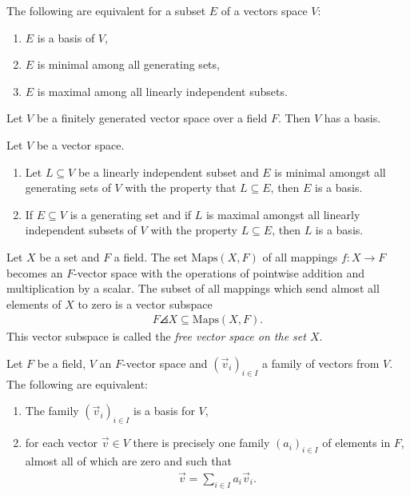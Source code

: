 \documentclass{article}
\begin{document}
\begin{theorem}[Theorem 1.5.12]
	The following are equivalent for a subset $E$ of a vectors space $V$:
	\begin{enumerate}
		\item $E$ is a basis of $V$,
		\item $E$ is minimal among all generating sets,
		\item $E$ is maximal among all linearly independent subsets.
	\end{enumerate}
\end{theorem}

\begin{corollary}[Corollary 1.5.13]
	Let $V$ be a finitely generated vector space over a field $F$. Then $V$
	has a basis.
\end{corollary}

\begin{theorem}[Theorem 1.5.14]
	Let $V$ be a vector space.
	\begin{enumerate}
		\item Let $L\subseteq V$ be a linearly independent subset and $E$ is minimal
		      amongst all generating sets of $V$ with the property that $L\subseteq E$,
		      then $E$ is a basis.
		\item If $E\subseteq V$ is a generating set and if $L$ is maximal amongst all
		      linearly independent subsets of $V$ with the property $L\subseteq E$, then
		      $L$ is a basis.
	\end{enumerate}
\end{theorem}

\begin{definition}
	Let $X$ be a set and $F$ a field. The set $\text{Maps}(X,F)$ of all mappings
	$f:X\to F$ becomes an $F$-vector space with the operations of pointwise
	addition and multiplication by a scalar. The subset of all mappings which send
	almost all elements of $X$ to zero is a vector subspace
	\begin{align*}
		F\angles{X}\subseteq \text{Maps}(X,F).
	\end{align*}
	This vector subspace is called the \emph{free vector space on the set $X$}.
\end{definition}

\begin{theorem}[Theorem 1.5.16]
	Let $F$ be a field, $V$ an $F$-vector space and $(\vec v_i)_{i\in I}$ a
	family of vectors from $V$. The following are equivalent:
	\begin{enumerate}
		\item The family $(\vec v_i)_{i\in I}$ is a basis for $V$,
		\item for each vector $\vec v\in V$ there is precisely one family $(a_i)_{i\in I}$
		      of elements in $F$, almost all of which are zero and such that \begin{align*}
			      \vec v = \sum_{i\in I}a_i\vec v_i.
		      \end{align*}
	\end{enumerate}
\end{theorem}
\end{document}
